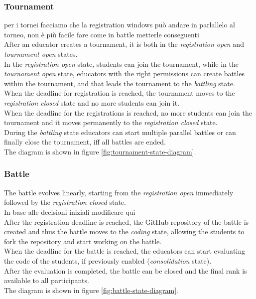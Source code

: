 \subsubsection*{Tournament}
{\color{red} per i tornei facciamo che la registration windows può andare in parlallelo al torneo, non è più facile fare come in battle metterle conseguenti} \\
After an educator creates a tournament, it is both in the \textit{registration open} and \textit{tournament open} states.\\
In the \textit{registration open} state, students can join the tournament, while in the \textit{tournament open} state, educators with the right permissions can create battles within the tournament, and that leads the tournament to the \textit{battling} state.\\
When the deadline for registration is reached, the tournament moves to the \textit{registration closed} state and no more students can join it.\\
When the deadline for the registrations is reached, no more students can join the tournament and it moves permanently to the \textit{registration closed} state.\\
During the \textit{battling} state educators can start multiple parallel battles or can finally close the tournament, iff all battles are ended.\\
  The diagram is shown in figure \ref{fig:tournament-state-diagram}.

\subsubsection*{Battle}
The battle evolves linearly, starting from the \textit{registration open} immediately followed by the \textit{registration closed} state.\\
{\color{red} In base alle decisioni iniziali modificare qui} \\
After the registration deadline is reached, the GitHub repository of the battle is created and thus the battle moves to the \textit{coding} state, allowing the students to fork the repository and start working on the battle.\\
When the deadline for the battle is reached, the educators can start evaluating the code of the students, if previously enabled (\textit{consolidation} state). \\
After the evaluation is completed, the battle can be closed and the final rank is available to all participants.\\
  The diagram is shown in figure \ref{fig:battle-state-diagram}.


